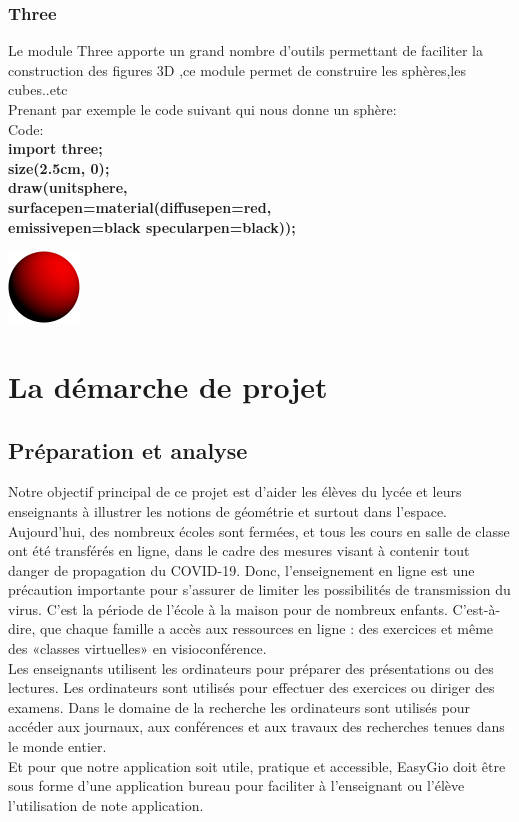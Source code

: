 \documentclass[a4paper]{report}
\begin{document}
\subsubsection{Three}
Le module Three apporte un grand nombre d’outils permettant de faciliter la construction des figures 3D ,ce module permet de construire les sphères,les cubes..etc\\
Prenant par exemple le code suivant qui nous donne un sphère:\\
Code:\\
\textbf{import three;\\
size(2.5cm, 0);\\
draw(unitsphere,\\
surfacepen=material(diffusepen=red,\\
emissivepen=black specularpen=black));}\\
\begin{center}
    \includegraphics{images/Des6.png}
\end{center}
\newpage
\section{La démarche de projet}
\subsection{Préparation et analyse}
Notre objectif principal de ce projet est d'aider les élèves du lycée et leurs enseignants à illustrer les notions de géométrie et surtout dans l'espace.\\
Aujourd'hui, des nombreux écoles sont fermées, et tous les cours en salle de classe ont été transférés en ligne, dans le cadre des mesures visant à contenir tout danger de propagation du COVID-19. Donc, l’enseignement en ligne est une précaution importante pour s’assurer de limiter les possibilités de transmission du virus. C’est la période de l’école à la maison pour de nombreux enfants. C’est-à-dire, que chaque famille a accès aux ressources en ligne : des exercices et même des «classes virtuelles» en visioconférence.\\
Les enseignants utilisent les ordinateurs pour préparer des présentations ou des lectures. Les ordinateurs sont utilisés pour effectuer des exercices ou diriger des examens. Dans le domaine de la recherche les ordinateurs sont utilisés pour accéder aux journaux, aux conférences et aux travaux des recherches tenues dans le monde entier.\\
Et pour que notre application soit utile, pratique et accessible, EasyGio doit être sous forme d'une application bureau pour faciliter à l'enseignant ou l'élève l'utilisation de note application. 
\end{document}
